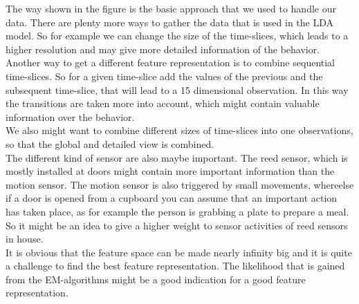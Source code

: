 \documentclass[11pt,a4paper]{article}
\begin{document}
The way shown in the figure is the basic approach that we used to handle our data. There are plenty more ways to gather the data that is used in the LDA model. So for example we can change the size of the time-slices, which leads to a higher resolution and may give more detailed information of the behavior. Another way to get a different feature representation is to combine sequential time-slices. So for a given time-slice add the values of the previous and the subsequent time-slice, that will lead to a 15 dimensional observation. In this way the transitions are taken more into account, which might contain valuable information over the behavior.\\
We also might want to combine different sizes of time-slices into one observations, so that the global and detailed view is combined.\\
The different kind of sensor are also maybe important. The reed sensor, which is mostly installed at doors might contain more important information than the motion sensor. The motion sensor is also triggered by small movements, whereelse if a door is opened from a cupboard you can assume that an important action has taken place, as for example the person is grabbing a plate to prepare a meal. So it might be an idea to give a higher weight to sensor activities of reed sensors in house.\\
It is obvious that the feature space can be made nearly infinity big and it is quite a challenge to find the best feature representation. The likelihood that is gained from the EM-algorithms might be a good indication for a good feature representation.

% 
\end{document}
